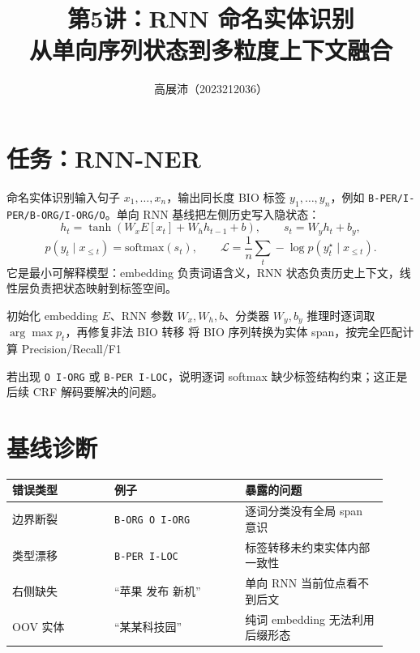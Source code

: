 \documentclass[UTF8,10pt,a4paper,fontset=none]{ctexart}
\title{\vspace{-0.9cm}\textbf{第5讲：RNN 命名实体识别}\\[2mm]\normalsize 从单向序列状态到多粒度上下文融合}
\author{高展沛（2023212036）}
\date{}
\begin{document}
\maketitle
\thispagestyle{plain}
\vspace{-0.95cm}

\section{任务：RNN-NER}
命名实体识别输入句子 $x_1,\ldots,x_n$，输出同长度 BIO 标签 $y_1,\ldots,y_n$，例如 \texttt{B-PER/I-PER/B-ORG/I-ORG/O}。单向 RNN 基线把左侧历史写入隐状态：
\[
h_t=\tanh(W_xE[x_t]+W_hh_{t-1}+b),\qquad s_t=W_yh_t+b_y,
\]
\[
p(y_t\mid x_{\le t})=\mathrm{softmax}(s_t),\qquad
\mathcal{L}=\frac{1}{n}\sum_t-\log p(y_t^\star\mid x_{\le t}).
\]
它是最小可解释模型：embedding 负责词语含义，RNN 状态负责历史上下文，线性层负责把状态映射到标签空间。

\begin{algorithm}[H]
\caption{基于 RNN 的 NER 训练、解码与评测}
初始化 embedding $E$、RNN 参数 $W_x,W_h,b$、分类器 $W_y,b_y$\;
推理时逐词取 $\arg\max p_t$，再修复非法 BIO 转移\;
将 BIO 序列转换为实体 span，按完全匹配计算 Precision/Recall/F1\;
\end{algorithm}

若出现 \texttt{O I-ORG} 或 \texttt{B-PER I-LOC}，说明逐词 softmax 缺少标签结构约束；这正是后续 CRF 解码要解决的问题。

\section{基线诊断}
\small
\begin{tabular}{@{}p{0.25\linewidth}p{0.32\linewidth}p{0.35\linewidth}@{}}
\toprule
错误类型 & 例子 & 暴露的问题 \\
\midrule
边界断裂 & \texttt{B-ORG O I-ORG} & 逐词分类没有全局 span 意识 \\
类型漂移 & \texttt{B-PER I-LOC} & 标签转移未约束实体内部一致性 \\
右侧缺失 & “苹果 发布 新机” & 单向 RNN 当前位点看不到后文 \\
OOV 实体 & “某某科技园” & 纯词 embedding 无法利用后缀形态 \\
\bottomrule
\end{tabular}
\normalsize
\end{document}
